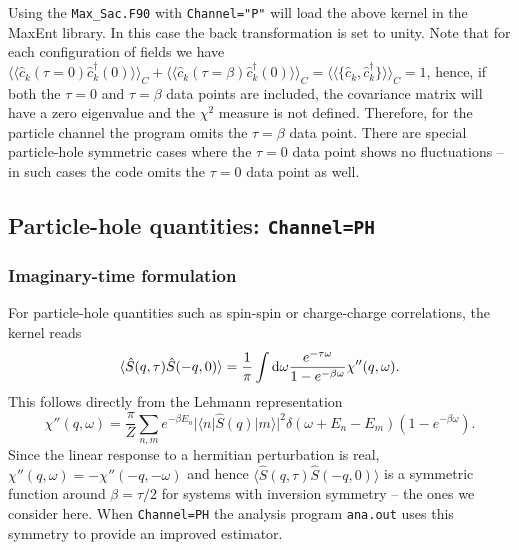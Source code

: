 Using the \texttt{Max\_Sac.F90}  with \texttt{Channel="P"}   will  load the above kernel in the MaxEnt library. In this case the back  transformation is set to unity.  
Note that for each  configuration of fields we have $ \langle  \langle \hat{c}^{\phantom\dagger}_{k} (\tau=0)  \hat{c}^{\dagger}_{k} (0)   \rangle  \rangle_{C} +   
\langle \langle \hat{c}^{\phantom\dagger}_{k} (\tau=\beta)  \hat{c}^{\dagger}_{k} (0)   \rangle \rangle_{C} = 
\langle \langle \big\{ \hat{c}^{\phantom\dagger}_{k},   \hat{c}^{\dagger}_{k}    \big\} \rangle \rangle_{C}   = 1$, hence, if both  the $\tau=0$ and $\tau=\beta$ data points are included, the covariance matrix will have a zero eigenvalue and the $\chi^{2}$ measure is not defined. Therefore, for the particle channel the program omits the $\tau=\beta$ data point. There are special  particle-hole symmetric  cases where the $\tau=0$ data point shows no  fluctuations -- in such cases the code omits the $\tau=0$ data point as well.

\subsection{Particle-hole quantities:  \texttt{Channel=PH}}

\subsubsection*{Imaginary-time formulation}
 For particle-hole quantities such as spin-spin or charge-charge correlations, 
the kernel reads
\begin{equation}
	\langle \hat{S}(q,\tau) \hat{S}(-q,0) \rangle  = \frac{1}{\pi} 
   \int \mathrm{d} \omega  \frac{e^{- \tau \omega} }{ 1 - e^{-\beta  \omega} } \chi''(q,\omega).
\end{equation}
This follows directly from the  Lehmann representation
\begin{equation}
 \chi''(q,\omega)  = \frac{\pi}{Z} \sum_{n,m} e^{-\beta E_n} |\langle n | \hat{S}(q) | m \rangle |^2 
\delta ( \omega + E_n - E_m) \left( 1 - e^{-\beta  \omega} \right) .
\end{equation}
Since the linear response to a hermitian perturbation  is real, $\chi''(q,\omega)  = - \chi''(-q,-\omega)$ and hence $\langle \hat{S}(q,\tau) \hat{S}(-q,0) \rangle $ is a symmetric function around $\beta= \tau/2$ for systems with inversion symmetry -- the ones we consider here.  When  \texttt{Channel=PH}  the analysis program \texttt{ana.out} uses this symmetry to provide an improved estimator. 

